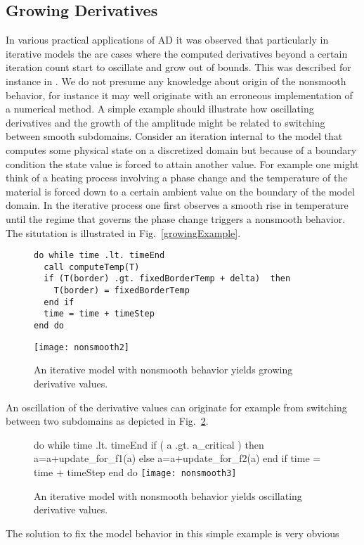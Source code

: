 \documentclass{article}
\newcommand{\reffig}[1]{{Fig.~\ref{#1}}}
\begin{document}
\subsection{Growing Derivatives}
In various practical applications of AD it was observed that particularly in iterative
models the are cases where the  computed derivatives beyond a certain iteration count 
start to oscillate and grow out of bounds. 
This was described for instance in \cite{bischof}. 
We do not presume any knowledge about origin of the nonsmooth behavior, for instance
it may well originate with an erroneous implementation of a numerical method. 
A simple example should illustrate how oscillating derivatives and the growth 
of the amplitude might be related to switching between smooth subdomains. 
Consider an iteration internal to the model that computes some physical state 
on a discretized domain but because of a boundary condition the state value is 
forced to attain another value. For example one might think of a heating process involving 
a phase change and the temperature of the material is forced down to a certain ambient 
value on the boundary of the model domain. 
In the iterative process one first observes a smooth rise in temperature until the 
regime that governs the phase change triggers a nonsmooth behavior. 
The situtation is illustrated in \reffig{growingExample}.
\begin{figure}
\begin{lstlisting}
do while time .lt. timeEnd
  call computeTemp(T)
  if (T(border) .gt. fixedBorderTemp + delta)  then 
    T(border) = fixedBorderTemp 
  end if
  time = time + timeStep
end do  
\end{lstlisting}
\texttt{[image: nonsmooth2]}
\caption{An iterative model with nonsmooth behavior yields 
growing derivative values.}\label{fig:growingExample} 
\end{figure}
An oscillation of the derivative values can originate for example from 
switching between two subdomains as depicted in  \reffig{fig:oscillatingExample}.
\begin{figure}
do while time .lt. timeEnd
  if ( a .gt. a\_critical ) 
  then
     a=a+update\_for\_f1(a)
  else 	
     a=a+update\_for\_f2(a)
  end if
  time = time + timeStep
end do  
\texttt{[image: nonsmooth3]}
\caption{An iterative model with nonsmooth behavior yields 
oscillating derivative values.}\label{fig:oscillatingExample} 
\end{figure}
The solution to fix the model behavior in this simple example is very obvious
\end{document}
